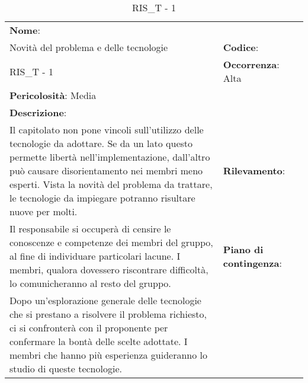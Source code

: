 \renewcommand{\arraystretch}{1.5}
\begin{longtable} { 
		>{\raggedright}p{} 
		>{\raggedright}p{} 
		>{\raggedright}p{}    }
		
		\caption{RIS\_T - 1} \endhead	


	\textbf{Nome}: \\ Novità del problema e delle tecnologie
	& \textbf{Codice}: \\ RIS\_T - 1  
	& \textbf{Occorrenza}: Alta \\ \textbf{Pericolosità}: Media
	
	\tabularnewline
	
	\textbf{Descrizione}: \\ Il capitolato non pone vincoli sull'utilizzo delle tecnologie da adottare. Se da un lato questo permette libertà nell'implementazione, dall'altro può causare disorientamento nei membri meno esperti. Vista la novità del problema da trattare, le tecnologie da impiegare potranno risultare nuove per molti.
	& 
	\textbf{Rilevamento}: \\ Il responsabile si occuperà di censire le conoscenze e competenze dei membri del gruppo, al fine di individuare particolari lacune. I membri, qualora dovessero riscontrare difficoltà, lo comunicheranno al resto del gruppo. 	
	&  
	\textbf{Piano di contingenza}: \\ Dopo un'esplorazione generale delle tecnologie che si prestano a risolvere il problema richiesto, ci si confronterà con il proponente per confermare la bontà delle scelte adottate. I membri che hanno più esperienza guideranno lo studio di queste tecnologie.

\end{longtable}


